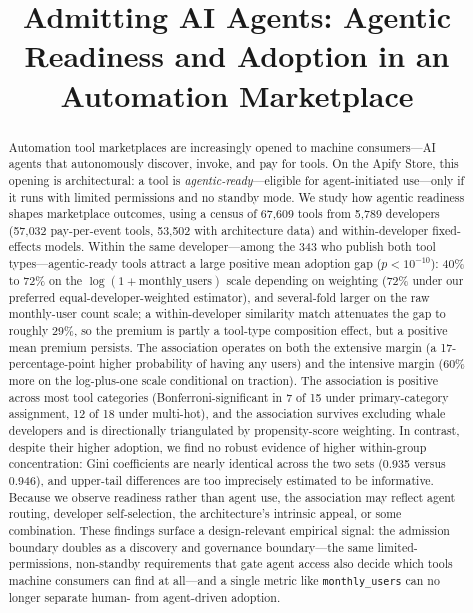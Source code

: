 \documentclass[manuscript,review,anonymous]{acmart}
\title{Admitting AI Agents: Agentic Readiness and Adoption in an Automation Marketplace}
\begin{document}
\begin{abstract}
Automation tool marketplaces are increasingly opened to machine consumers---AI
agents that autonomously discover, invoke, and pay for tools. On the Apify
Store, this opening is architectural: a tool is \emph{agentic-ready}---eligible
for agent-initiated use---only if it runs with limited permissions and no
standby mode. We study how agentic readiness shapes marketplace outcomes, using
a census of 67{,}609 tools from 5{,}789 developers (57{,}032 pay-per-event
tools, 53{,}502 with architecture data) and within-developer fixed-effects
models. Within the same developer---among the 343 who publish both tool
types---agentic-ready tools attract a large positive mean adoption gap
($p < 10^{-10}$): 40\% to 72\% on the
$\log(1+\text{monthly\_users})$ scale depending on weighting (72\% under our
preferred equal-developer-weighted estimator), and several-fold larger on the
raw monthly-user count scale; a within-developer similarity match attenuates
the gap to roughly 29\%, so the premium is partly a tool-type composition
effect, but a positive mean premium persists. The association operates on both
the extensive margin (a
17-percentage-point higher probability of having any users) and the intensive
margin (60\% more on the log-plus-one scale conditional on traction). The
association is positive across most tool categories (Bonferroni-significant in 7 of 15
under primary-category assignment, 12 of 18 under multi-hot), and the
association survives excluding whale developers and is directionally
triangulated by propensity-score weighting. In contrast, despite their higher
adoption, we find no robust evidence of higher within-group concentration: Gini
coefficients are nearly identical across the two sets (0.935 versus 0.946), and
upper-tail differences are too imprecisely estimated to be informative. Because
we observe readiness rather than agent use, the association may reflect agent
routing, developer self-selection, the architecture's intrinsic appeal, or some
combination. These findings surface a design-relevant empirical signal: the
admission boundary doubles as a discovery and governance boundary---the same
limited-permissions, non-standby requirements that gate agent access also
decide which tools machine consumers can find at all---and a single metric like
\texttt{monthly\_users} can no longer separate human- from agent-driven
adoption.
\end{abstract}


\maketitle











\end{document}
